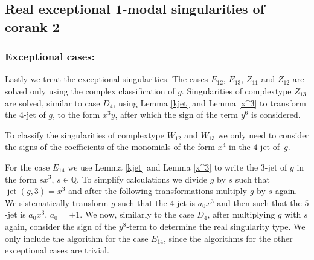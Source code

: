 \documentclass[noend]{amsproc}
\DeclareMathOperator{\jt}{jet}
\begin{document}
\subsection{Real exceptional $\mathbf 1$-modal singularities of corank $\mathbf 2$}
\label{ExceptionalSingularities}
\subsubsection{Exceptional cases:}Lastly we treat the exceptional singularities. The cases $E_{12}$, $E_{13}$,
$Z_{11}$ and $Z_{12}$ are solved only using the complex classification of $g$.
Singularities of complextype $Z_{13}$ are solved, similar to case $D_{4}$,
using Lemma \ref{kjet} and Lemma \ref{x^3} to transform the $4$-jet of $g$, to
the form $x^3y$, after which the sign of the term $y^6$ is considered.

To classify the singularities of complextype $W_{12}$ and $W_{13}$ we only need
to consider the signs of the coefficients of the monomials of the form $x^4$ in
the $4$-jet of~$g$.

For the case $E_{14}$ we use Lemma \ref{kjet} and Lemma \ref{x^3} to write the
$3$-jet of $g$ in the form $sx^3$, $s\in\mathbb Q$. To simplify calculations we
divide $g$ by $s$ such that $\jt(g,3)=x^3$ and after the following
transformations multiply $g$ by $s$ again. We sistematically transform $g$ such
that the $4$-jet is $a_0x^3$ and then such that the $5$-jet is $a_0x^3$,
$a_0=\pm 1$.  We now, similarly to the case $D_4$, after multiplying $g$ with
$s$ again, consider the sign of the $y^8$-term to determine the real
singularity type. We only include the algorithm for the case $E_{14}$, since
the algorithms for the other exceptional cases are trivial.
\end{document}
